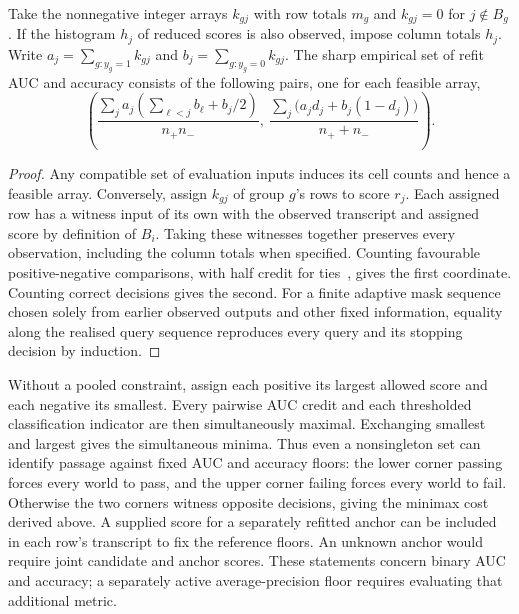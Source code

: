 \begin{proposition}
\label{prop:ensemble-identification}
Take the nonnegative integer arrays $k_{gj}$ with row totals $m_g$ and $k_{gj}=0$ for $j\notin B_g$. If the histogram $h_j$ of reduced scores is also observed, impose column totals $h_j$. Write $a_j=\sum_{g:y_g=1}k_{gj}$ and $b_j=\sum_{g:y_g=0}k_{gj}$. The sharp empirical set of refit AUC and accuracy consists of the following pairs, one for each feasible array,
\begin{equation}
\left(
 \frac{\sum_j a_j(\sum_{\ell<j}b_\ell+b_j/2)}{n_+n_-},\
 \frac{\sum_j \bigl(a_jd_j+b_j(1-d_j)\bigr)}{n_++n_-}
\right).
\label{eq:ensemble-set}
\end{equation}
\end{proposition}
\begin{proof}
Any compatible set of evaluation inputs induces its cell counts and hence a feasible array. Conversely, assign $k_{gj}$ of group $g$'s rows to score $r_j$. Each assigned row has a witness input of its own with the observed transcript and assigned score by definition of $B_i$. Taking these witnesses together preserves every observation, including the column totals when specified. Counting favourable positive-negative comparisons, with half credit for ties~\cite{bamber1975area}, gives the first coordinate. Counting correct decisions gives the second. For a finite adaptive mask sequence chosen solely from earlier observed outputs and other fixed information, equality along the realised query sequence reproduces every query and its stopping decision by induction.
\end{proof}

Without a pooled constraint, assign each positive its largest allowed score and each negative its smallest. Every pairwise AUC credit and each thresholded classification indicator are then simultaneously maximal. Exchanging smallest and largest gives the simultaneous minima. Thus even a nonsingleton set can identify passage against fixed AUC and accuracy floors: the lower corner passing forces every world to pass, and the upper corner failing forces every world to fail. Otherwise the two corners witness opposite decisions, giving the minimax cost derived above. A supplied score for a separately refitted anchor can be included in each row's transcript to fix the reference floors. An unknown anchor would require joint candidate and anchor scores. These statements concern binary AUC and accuracy; a separately active average-precision floor requires evaluating that additional metric.


